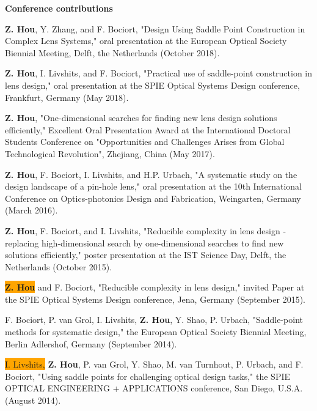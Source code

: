 \vspace{3mm}
\noindent
\Large{\textbf{Conference contributions}}
\begin{enumerate}\small{
\item \textbf{Z. Hou}, Y. Zhang, and F. Bociort, "Design Using Saddle Point Construction in Complex Lens Systems," oral presentation at the European Optical Society Biennial Meeting, Delft, the Netherlands (October 2018).
\item \textbf{Z. Hou}, I. Livshits, and F. Bociort, "Practical use of saddle-point construction in lens design," oral presentation at the SPIE Optical Systems Design conference, Frankfurt, Germany (May 2018).
\item \textbf{Z. Hou}, "One-dimensional searches for finding new lens design solutions efficiently,"  Excellent Oral Presentation Award at the International Doctoral Students Conference on "Opportunities and Challenges Arises from Global Technological Revolution", Zhejiang, China (May 2017).
\item \textbf{Z. Hou}, F. Bociort, I. Livshits, and H.P. Urbach, "A systematic study on the design landscape of a pin-hole lens," oral presentation at the 10th International Conference on Optics-photonics Design and Fabrication, Weingarten, Germany  (March 2016).
\item \textbf{Z. Hou}, F. Bociort, and I. Livshits, "Reducible complexity in lens design - 
replacing high-dimensional search by one-dimensional searches to find new solutions efficiently," poster presentation at the IST Science Day, Delft, the Netherlands (October 2015).
\item \colorbox{orange}{\textbf{Z. Hou}} and F. Bociort, "Reducible complexity in lens design," invited Paper at the SPIE Optical Systems Design conference, Jena, Germany (September 2015). 
\item F. Bociort, P. van Grol, I. Livshits, \textbf{Z. Hou}, Y. Shao, P. Urbach, "Saddle-point methods for systematic design," the European Optical Society Biennial Meeting, Berlin Adlershof, Germany (September 2014).
\item \colorbox{orange}{I. Livshits,} \textbf{Z. Hou}, P. van Grol, Y. Shao, M. van Turnhout, P. Urbach, and F. Bociort, "Using saddle points for challenging optical design tasks," the SPIE OPTICAL ENGINEERING + APPLICATIONS conference, San Diego, U.S.A. (August 2014).

}\end{enumerate}

